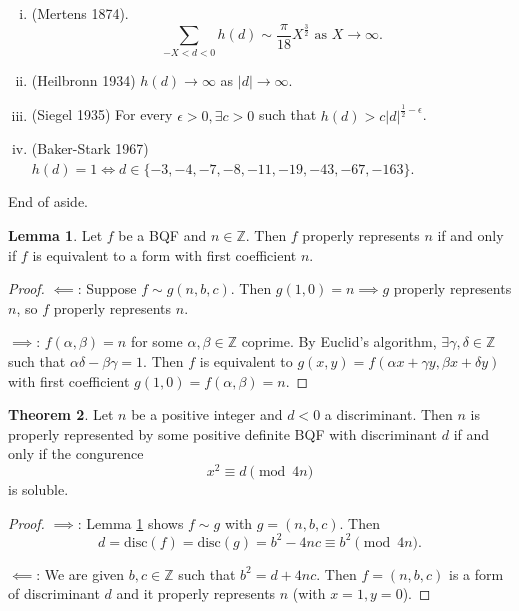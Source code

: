 \documentclass{article}
\theoremstyle{definition}
\newtheorem{theorem}{Theorem}[section]
\newtheorem{lemma}[theorem]{Lemma}
\begin{document}
\begin{enumerate}[(i)]
    \item (Mertens 1874). \[
    \sum_{-X<d<0}^{} h(d) \sim \frac{\pi}{18} X^{\frac{3}{2}} \text{ as } X \to \infty.
    \]
    \item (Heilbronn 1934) $h(d) \to \infty$ as $|d| \to \infty$.
    \item (Siegel 1935) For every $\epsilon>0, \exists c>0$ such that $h(d)>c |d|^{\frac{1}{2}-\epsilon}$.
    \item (Baker-Stark 1967) $h(d)=1 \iff d \in \{-3,-4,-7,-8,-11,-19,-43,-67,-163\}$.
\end{enumerate}
End of aside.

\begin{lemma}\label{4.9}
    Let $f$ be a BQF and $n \in \mathbb{Z}$. Then $f$ properly represents $n$ if and only if $f$ is equivalent to a form with first coefficient $n$.
\end{lemma}
\begin{proof}
    $\impliedby$: Suppose $f \sim g(n,b,c)$. Then $g(1,0)=n \implies g$ properly represents $n$, so $f$ properly represents $n$.
    \vspace{1mm}
    
    $\implies$: $f(\alpha,\beta)=n$ for some $\alpha,\beta \in \mathbb{Z}$ coprime. By Euclid's algorithm, $\exists \gamma,\delta \in \mathbb{Z}$ such that $\alpha \delta - \beta \gamma = 1$. Then $f$ is equivalent to $g(x,y) = f(\alpha x + \gamma y, \beta x + \delta y)$ with first coefficient $g(1,0) = f(\alpha,\beta)=n$.
\end{proof}
\begin{theorem}
    Let $n$ be a positive integer and $d<0$ a discriminant. Then $n$ is properly represented by some positive definite BQF with discriminant $d$ if and only if the congurence $$x^2 \equiv d \pmod{4n}$$ is soluble.
\end{theorem}
\begin{proof}
    $\implies$: Lemma \ref{4.9} shows $f \sim g$ with $g = (n,b,c)$. Then $$d = \text{disc}(f) = \text{disc}(g) = b^2 - 4nc \equiv b^2 \pmod{4n}.$$
    \vspace{1mm}
    
    $\impliedby$: We are given $b,c \in \mathbb{Z}$ such that $b^2 = d + 4nc$. Then $f = (n,b,c)$ is a form of discriminant $d$ and it properly represents $n$ (with $x=1,y=0$).
\end{proof}
\end{document}
